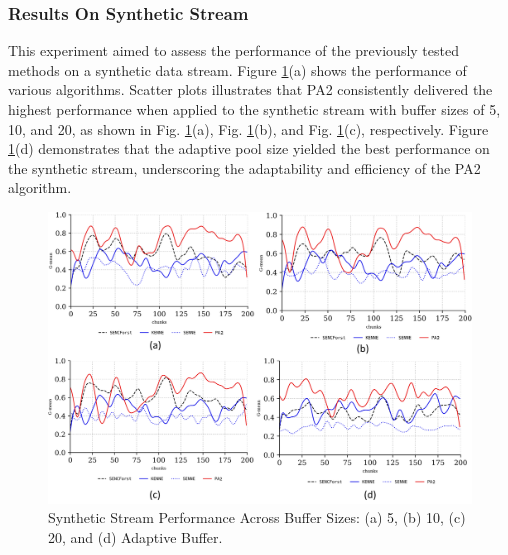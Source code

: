 \subsubsection{Results On Synthetic Stream}
\label{sec:synthetic}
This experiment aimed to assess the performance of the previously tested methods on a synthetic data stream. Figure \ref{fig:res3}(a) shows the performance of various algorithms. Scatter plots illustrates that PA2 consistently delivered the highest performance when applied to the synthetic stream with buffer sizes of 5, 10, and 20, as shown in Fig. \ref{fig:res3}(a), Fig. \ref{fig:res3}(b), and Fig. \ref{fig:res3}(c), respectively. Figure \ref{fig:res3}(d) demonstrates that the adaptive pool size yielded the best performance on the synthetic stream, underscoring the adaptability and efficiency of the PA2 algorithm.

\begin{figure}[!ht]
	\centering
	\includegraphics[width=1\linewidth]{5_Emerging/images/res3.png}
	\caption{Synthetic Stream Performance Across Buffer Sizes: (a) 5, (b) 10, (c) 20, and (d) Adaptive Buffer.}

	\label{fig:res3}
\end{figure}				

